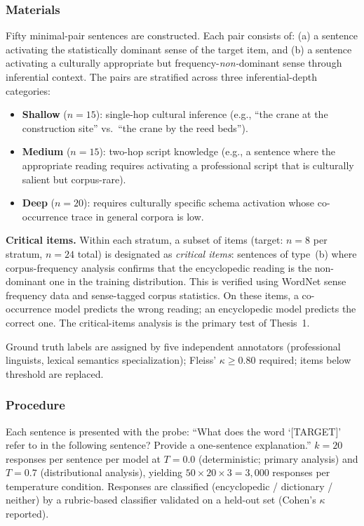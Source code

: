 \documentclass[12pt,a4paper]{article}
\begin{document}
\subsubsection{Materials}

Fifty minimal-pair sentences are constructed. Each pair consists of:
(a) a sentence activating the statistically dominant sense of the target item,
and (b) a sentence activating a culturally appropriate but frequency-\emph{non-}dominant
sense through inferential context. The pairs are stratified across three
inferential-depth categories:

\begin{itemize}
\item \textbf{Shallow} ($n = 15$): single-hop cultural inference
      (e.g., ``the crane at the construction site'' vs.\ ``the crane by the
      reed beds'').
\item \textbf{Medium} ($n = 15$): two-hop script knowledge
      (e.g., a sentence where the appropriate reading requires activating a
      professional script that is culturally salient but corpus-rare).
\item \textbf{Deep} ($n = 20$): requires culturally specific schema activation
      whose co-occurrence trace in general corpora is low.
\end{itemize}

\noindent\textbf{Critical items.} Within each stratum, a subset of items
(target: $n = 8$ per stratum, $n = 24$ total) is designated as
\emph{critical items}: sentences of type~(b) where corpus-frequency analysis
confirms that the encyclopedic reading is the non-dominant one in the training
distribution. This is verified using WordNet sense frequency data
\citep{Miller1995} and sense-tagged corpus statistics. On these items, a
co-occurrence model predicts the wrong reading; an encyclopedic model predicts
the correct one. The critical-items analysis is the primary test of Thesis~1.

Ground truth labels are assigned by five independent annotators (professional
linguists, lexical semantics specialization); Fleiss' $\kappa \geq 0.80$
required; items below threshold are replaced.

\subsubsection{Procedure}

Each sentence is presented with the probe: ``What does the word `[TARGET]' refer
to in the following sentence? Provide a one-sentence explanation.'' $k = 20$
responses per sentence per model at $T = 0.0$ (deterministic; primary analysis)
and $T = 0.7$ (distributional analysis), yielding $50 \times 20 \times 3 = 3{,}000$
responses per temperature condition. Responses are classified (encyclopedic /
dictionary / neither) by a rubric-based classifier validated on a held-out
set (Cohen's $\kappa$ reported).
\end{document}
